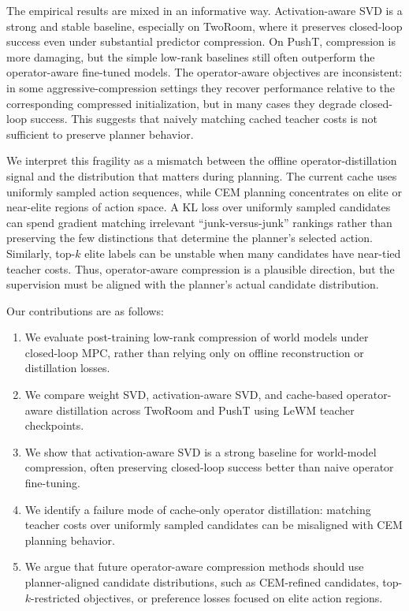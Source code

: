 \documentclass[11pt]{article}
\begin{document}
The empirical results are mixed in an informative way. Activation-aware SVD is a strong and stable baseline, especially on TwoRoom, where it preserves closed-loop success even under substantial predictor compression. On PushT, compression is more damaging, but the simple low-rank baselines still often outperform the operator-aware fine-tuned models. The operator-aware objectives are inconsistent: in some aggressive-compression settings they recover performance relative to the corresponding compressed initialization, but in many cases they degrade closed-loop success. This suggests that naively matching cached teacher costs is not sufficient to preserve planner behavior.

We interpret this fragility as a mismatch between the offline operator-distillation signal and the distribution that matters during planning. The current cache uses uniformly sampled action sequences, while CEM planning concentrates on elite or near-elite regions of action space. A KL loss over uniformly sampled candidates can spend gradient matching irrelevant ``junk-versus-junk'' rankings rather than preserving the few distinctions that determine the planner's selected action. Similarly, top-\(k\) elite labels can be unstable when many candidates have near-tied teacher costs. Thus, operator-aware compression is a plausible direction, but the supervision must be aligned with the planner's actual candidate distribution.

Our contributions are as follows:

\begin{enumerate}[leftmargin=*]
    \item We evaluate post-training low-rank compression of world models under closed-loop MPC, rather than relying only on offline reconstruction or distillation losses.
    \item We compare weight SVD, activation-aware SVD, and cache-based operator-aware distillation across TwoRoom and PushT using LeWM teacher checkpoints.
    \item We show that activation-aware SVD is a strong baseline for world-model compression, often preserving closed-loop success better than naive operator fine-tuning.
    \item We identify a failure mode of cache-only operator distillation: matching teacher costs over uniformly sampled candidates can be misaligned with CEM planning behavior.
    \item We argue that future operator-aware compression methods should use planner-aligned candidate distributions, such as CEM-refined candidates, top-\(k\)-restricted objectives, or preference losses focused on elite action regions.
\end{enumerate}
\end{document}
